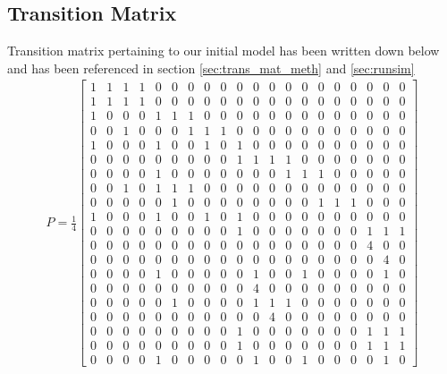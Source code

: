 \documentclass{article}
\theoremstyle{definition}
\theoremstyle{remark}
\numberwithin{equation}{section}
\begin{document}
\subsection{Transition Matrix}
Transition matrix pertaining to our initial model has been written down below and has been referenced in section \ref{sec:trans_mat_meth} and \ref{sec:runsim}
\begin{align}
    \label{eqn:trans_matrix}
    P = \frac{1}{4}
    \begin{bmatrix}
    1 & 1 & 1 & 1 & 0 & 0 & 0 & 0 & 0 & 0 & 0 & 0 & 0 & 0 & 0 & 0 & 0 & 0 & 0 & 0 \\
    1 & 1 & 1 & 1 & 0 & 0 & 0 & 0 & 0 & 0 & 0 & 0 & 0 & 0 & 0 & 0 & 0 & 0 & 0 & 0 \\
    1 & 0 & 0 & 0 & 1 & 1 & 1 & 0 & 0 & 0 & 0 & 0 & 0 & 0 & 0 & 0 & 0 & 0 & 0 & 0 \\
    0 & 0 & 1 & 0 & 0 & 0 & 1 & 1 & 1 & 0 & 0 & 0 & 0 & 0 & 0 & 0 & 0 & 0 & 0 & 0 \\
    1 & 0 & 0 & 0 & 1 & 0 & 0 & 1 & 0 & 1 & 0 & 0 & 0 & 0 & 0 & 0 & 0 & 0 & 0 & 0 \\
    0 & 0 & 0 & 0 & 0 & 0 & 0 & 0 & 0 & 1 & 1 & 1 & 1 & 0 & 0 & 0 & 0 & 0 & 0 & 0 \\
    0 & 0 & 0 & 0 & 1 & 0 & 0 & 0 & 0 & 0 & 0 & 0 & 1 & 1 & 1 & 0 & 0 & 0 & 0 & 0 \\
    0 & 0 & 1 & 0 & 1 & 1 & 1 & 0 & 0 & 0 & 0 & 0 & 0 & 0 & 0 & 0 & 0 & 0 & 0 & 0 \\
    0 & 0 & 0 & 0 & 0 & 1 & 0 & 0 & 0 & 0 & 0 & 0 & 0 & 0 & 1 & 1 & 1 & 0 & 0 & 0 \\
    1 & 0 & 0 & 0 & 1 & 0 & 0 & 1 & 0 & 1 & 0 & 0 & 0 & 0 & 0 & 0 & 0 & 0 & 0 & 0 \\
    0 & 0 & 0 & 0 & 0 & 0 & 0 & 0 & 0 & 1 & 0 & 0 & 0 & 0 & 0 & 0 & 0 & 1 & 1 & 1 \\
    0 & 0 & 0 & 0 & 0 & 0 & 0 & 0 & 0 & 0 & 0 & 0 & 0 & 0 & 0 & 0 & 0 & 4 & 0 & 0 \\
    0 & 0 & 0 & 0 & 0 & 0 & 0 & 0 & 0 & 0 & 0 & 0 & 0 & 0 & 0 & 0 & 0 & 0 & 4 & 0 \\
    0 & 0 & 0 & 0 & 1 & 0 & 0 & 0 & 0 & 0 & 1 & 0 & 0 & 1 & 0 & 0 & 0 & 0 & 1 & 0 \\
    0 & 0 & 0 & 0 & 0 & 0 & 0 & 0 & 0 & 0 & 4 & 0 & 0 & 0 & 0 & 0 & 0 & 0 & 0 & 0 \\
    0 & 0 & 0 & 0 & 0 & 1 & 0 & 0 & 0 & 0 & 1 & 1 & 1 & 0 & 0 & 0 & 0 & 0 & 0 & 0 \\
    0 & 0 & 0 & 0 & 0 & 0 & 0 & 0 & 0 & 0 & 0 & 4 & 0 & 0 & 0 & 0 & 0 & 0 & 0 & 0 \\
    0 & 0 & 0 & 0 & 0 & 0 & 0 & 0 & 0 & 1 & 0 & 0 & 0 & 0 & 0 & 0 & 0 & 1 & 1 & 1 \\
    0 & 0 & 0 & 0 & 0 & 0 & 0 & 0 & 0 & 1 & 0 & 0 & 0 & 0 & 0 & 0 & 0 & 1 & 1 & 1 \\
    0 & 0 & 0 & 0 & 1 & 0 & 0 & 0 & 0 & 0 & 1 & 0 & 0 & 1 & 0 & 0 & 0 & 0 & 1 & 0
    \end{bmatrix}
\end{align}
\end{document}

